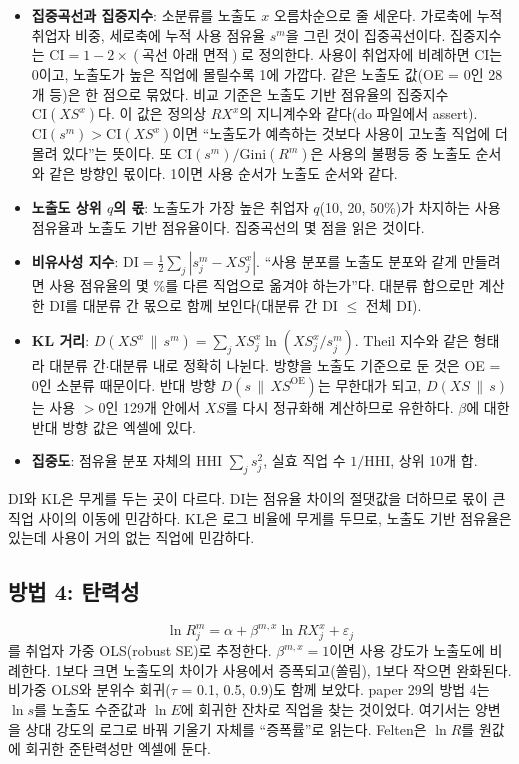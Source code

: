 \documentclass[11pt]{article}
\begin{document}
\begin{itemize}[leftmargin=*]
  \item \textbf{집중곡선과 집중지수}: 소분류를 노출도 $x$ 오름차순으로 줄 세운다. 가로축에 누적 취업자 비중, 세로축에 누적 사용 점유율 $s^m$을 그린 것이 집중곡선이다. 집중지수는 $\mathrm{CI} = 1 - 2 \times (\text{곡선 아래 면적})$로 정의한다. 사용이 취업자에 비례하면 CI는 0이고, 노출도가 높은 직업에 몰릴수록 1에 가깝다. 같은 노출도 값(OE = 0인 28개 등)은 한 점으로 묶었다. 비교 기준은 노출도 기반 점유율의 집중지수 $\mathrm{CI}(XS^x)$다. 이 값은 정의상 $RX^x$의 지니계수와 같다(do 파일에서 assert). $\mathrm{CI}(s^m) > \mathrm{CI}(XS^x)$이면 ``노출도가 예측하는 것보다 사용이 고노출 직업에 더 몰려 있다''는 뜻이다. 또 $\mathrm{CI}(s^m) / \mathrm{Gini}(R^m)$은 사용의 불평등 중 노출도 순서와 같은 방향인 몫이다. 1이면 사용 순서가 노출도 순서와 같다.
  \item \textbf{노출도 상위 $q$의 몫}: 노출도가 가장 높은 취업자 $q$(10, 20, 50\%)가 차지하는 사용 점유율과 노출도 기반 점유율이다. 집중곡선의 몇 점을 읽은 것이다.
  \item \textbf{비유사성 지수}: $\mathrm{DI} = \tfrac{1}{2} \sum_j |s^m_j - XS^x_j|$. ``사용 분포를 노출도 분포와 같게 만들려면 사용 점유율의 몇 \%를 다른 직업으로 옮겨야 하는가''다. 대분류 합으로만 계산한 DI를 대분류 간 몫으로 함께 보인다(대분류 간 DI $\le$ 전체 DI).
  \item \textbf{KL 거리}: $D(XS^x \,\|\, s^m) = \sum_j XS^x_j \ln(XS^x_j / s^m_j)$. Theil 지수와 같은 형태라 대분류 간$\cdot$대분류 내로 정확히 나뉜다. 방향을 노출도 기준으로 둔 것은 OE = 0인 소분류 때문이다. 반대 방향 $D(s \,\|\, XS^{\mathrm{OE}})$는 무한대가 되고, $D(XS \,\|\, s)$는 사용 $> 0$인 129개 안에서 $XS$를 다시 정규화해 계산하므로 유한하다. $\beta$에 대한 반대 방향 값은 엑셀에 있다.
  \item \textbf{집중도}: 점유율 분포 자체의 HHI $\sum_j s_j^2$, 실효 직업 수 $1/\mathrm{HHI}$, 상위 10개 합.
\end{itemize}
DI와 KL은 무게를 두는 곳이 다르다. DI는 점유율 차이의 절댓값을 더하므로 몫이 큰 직업 사이의 이동에 민감하다. KL은 로그 비율에 무게를 두므로, 노출도 기반 점유율은 있는데 사용이 거의 없는 직업에 민감하다.

\subsection{방법 4: 탄력성}

\[
\ln R^m_j = \alpha + \beta^{m,x} \ln RX^x_j + \varepsilon_j
\]
를 취업자 가중 OLS(robust SE)로 추정한다. $\beta^{m,x} = 1$이면 사용 강도가 노출도에 비례한다. 1보다 크면 노출도의 차이가 사용에서 증폭되고(쏠림), 1보다 작으면 완화된다. 비가중 OLS와 분위수 회귀($\tau$ = 0.1, 0.5, 0.9)도 함께 보았다. paper 29의 방법 4는 $\ln s$를 노출도 수준값과 $\ln E$에 회귀한 잔차로 직업을 찾는 것이었다. 여기서는 양변을 상대 강도의 로그로 바꿔 기울기 자체를 ``증폭률''로 읽는다. Felten은 $\ln R$를 원값에 회귀한 준탄력성만 엑셀에 둔다.
\end{document}
